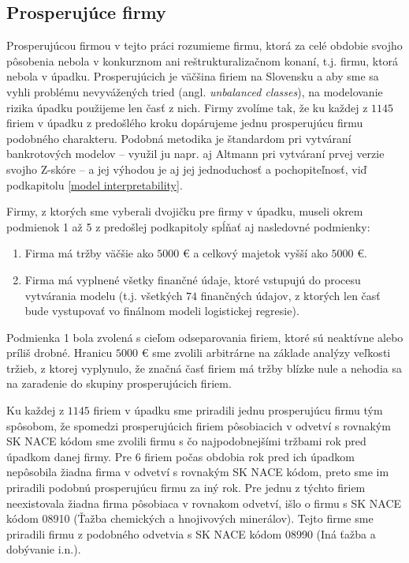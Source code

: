 \subsection{Prosperujúce firmy}

Prosperujúcou firmou v tejto práci rozumieme firmu, ktorá za celé obdobie svojho pôsobenia nebola v konkurznom ani reštrukturalizačnom konaní, t.j. firmu, ktorá nebola v úpadku.
Prosperujúcich je väčšina firiem na Slovensku a aby sme sa vyhli problému nevyvážených tried (angl. \emph{unbalanced classes}),
na modelovanie rizika úpadku použijeme len časť z nich.
Firmy zvolíme tak, že ku každej z \(1145\) firiem v úpadku z predošlého kroku dopárujeme jednu prosperujúcu firmu podobného charakteru.
Podobná metodika je štandardom pri vytváraní bankrotových modelov – využil ju napr. aj Altmann pri vytváraní prvej verzie svojho Z-skóre – a jej výhodou je aj jej jednoduchosť a pochopiteľnosť, viď podkapitolu \ref{model interpretability}.

Firmy, z ktorých sme vyberali dvojičku pre firmy v úpadku, museli okrem podmienok 1 až 5 z predošlej podkapitoly spĺňať aj nasledovné podmienky:

\begin{enumerate}
    \item Firma má tržby väčšie ako \(5000\) € a celkový majetok vyšší ako \(5000\) €.
    \item Firma má vyplnené všetky finančné údaje, ktoré vstupujú do procesu vytvárania modelu (t.j. všetkých \(74\) finančných údajov, z ktorých len časť bude vystupovať vo finálnom modeli logistickej regresie).
\end{enumerate}

Podmienka 1 bola zvolená s cieľom odseparovania firiem, ktoré sú neaktívne alebo príliš drobné.
Hranicu \(5000\) € sme zvolili arbitrárne na základe analýzy veľkosti tržieb, z ktorej vyplynulo, že značná časť firiem má tržby blízke nule a nehodia sa na zaradenie do skupiny prosperujúcich firiem.

Ku každej z \(1145\) firiem v úpadku sme priradili jednu prosperujúcu firmu tým spôsobom,
že spomedzi prosperujúcich firiem pôsobiacich v odvetví s rovnakým SK NACE kódom sme zvolili firmu s čo najpodobnejšími tržbami rok pred úpadkom danej firmy.
Pre \(6\) firiem počas obdobia rok pred ich úpadkom nepôsobila žiadna firma v odvetví s rovnakým SK NACE kódom, preto sme im priradili podobnú prosperujúcu firmu za iný rok.
Pre jednu z týchto firiem neexistovala žiadna firma pôsobiaca v rovnakom odvetví, išlo o firmu s SK NACE kódom 08910 (Ťažba chemických a hnojivových minerálov).
Tejto firme sme priradili firmu z podobného odvetvia s SK NACE kódom 08990 (Iná ťažba a dobývanie i.n.).

